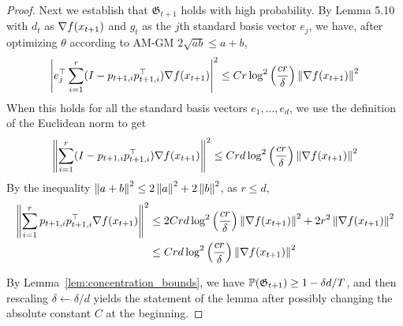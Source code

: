 \begin{proof}
    Next we establish that $\mathfrak G_{t+1}$ holds with high probability. By Lemma 5.10 with $d_t$ as $\grad f(x_{t+1})$ and $g_t$ as the $j$th standard basis vector $e_j$, we have, after optimizing $\theta$ according to AM-GM $2\sqrt{ab} \leq a+b$,
    \begin{align*}
        \left|e_j^\top \sum_{i=1}^r (I-p_{t+1, i}p_{t+1, i}^\top) \grad f(x_{t+1}) \right|^2 \leq Cr\log^2\left(\frac{cr}{\delta}\right) \mg{\grad f(x_{t+1})}^2
    \end{align*}
    When this holds for all the standard basis vectors $e_1, \ldots, e_d$, we use the definition of the Euclidean norm to get
    \begin{align*}
        \mg{\sum_{i=1}^r (I-p_{t+1, i}p_{t+1, i}^\top) \grad f(x_{t+1})}^2 \leq Crd \log^2\left(\frac{cr}{\delta}\right) \mg{\grad f(x_{t+1})}^2
    \end{align*}
    By the inequality $\mg{a+b}^2 \leq 2\mg{a}^2 + 2\mg{b}^2$, as $r \leq d$,
    \begin{align*}
        \mg{\sum_{i=1}^r p_{t+1,i}p_{t+1,i}^\top \grad f(x_{t+1})}^2 &\leq 2Crd \log^2\left(\frac{cr}{\delta}\right) \mg{\grad f(x_{t+1})}^2 + 2r^2\mg{\grad f(x_{t+1})}^2
        \\&\leq Crd \log^2\left(\frac{cr}{\delta}\right) \mg{\grad f(x_{t+1})}^2
    \end{align*}
    
    By Lemma~\ref{lem:concentration_bounds}, we have $\P(\mathfrak G_{t+1}) \geq 1-\delta d/T$, and then rescaling $\delta \gets \delta/d$ yields the statement of the lemma after possibly changing the absolute constant $C$ at the beginning.
\end{proof}

